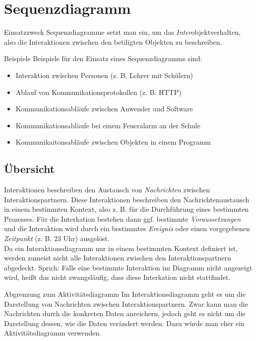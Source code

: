 \section{Sequenzdiagramm}

\begin{notebox}{Einsatzzweck}
Sequenzdiagramme setzt man ein, um das \textit{Inter}objektverhalten, also die Interaktionen zwischen den betiligten Objekten zu beschreiben. 	
\end{notebox}

\begin{tipbox}{Beispiele}
Beispiele für den Einsatz eines Sequenzdiagramms sind:
	\begin{itemize}
		\item Interaktion zwischen Personen (z. B. Lehrer mit Schülern)
		\item Ablauf von Kommunikationsprotokollen (z. B. HTTP)
		\item Kommunikationsabläufe zwischen Anwender und Software
		\item Kommunikationsabläufe bei einem Feueralarm an der Schule
		\item Kommunikaitonsabläufe zwischen Objekten in einem Programm
	\end{itemize}	
\end{tipbox}

\subsection{Übersicht}

Interaktionen beschreiben den Austausch von \textit{Nachrichten} zwischen Interaktionspartnern. Diese Interaktionen beschreiben den Nachrichtenaustausch in einem bestimmten Kontext, also z. B. für die Durchführung eines bestimmten Prozesses. Für die Interkation bestehen dann ggf. bestimmte \textit{Voraussetzungen} und die Interaktion wird durch ein bestimmtes \textit{Ereignis} oder einen vorgegebenen \textit{Zeitpunkt} (z. B. 23 Uhr) ausgelöst. \\

Da ein Interaktionsdiagramm nur in einem bestimmten Kontext definiert ist, werden zumeist nicht alle Interaktionen zwischen den Interaktionspartnern abgedeckt. Sprich: Falls eine bestimmte Interaktion im Diagramm nicht angezeigt wird, heißt das nicht zwangsläufig, dass diese Interkation nicht stattfindet. 

\begin{importantbox}{Abgrenzung zum Aktivitätsdiagramm}
Im Interaktionsdiagramm geht es um die Darstellung von Nachrichten zwischen Interaktionspartnern. Zwar kann man die Nachrichten durch die konkreten Daten anreichern, jedoch geht es nicht um die Darstellung dessen, wie die Daten verändert werden. Dazu würde man eher ein Aktivitätsdiagramm verwenden.	
\end{importantbox}

